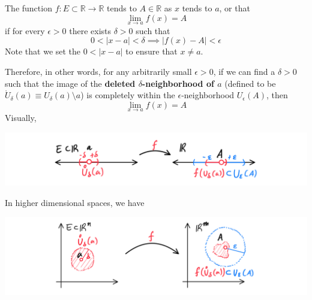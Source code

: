 \documentclass{article}
\begin{document}
    \begin{definition}
      The function $f: E \subset \mathbb{R} \longrightarrow \mathbb{R}$ tends to $A \in \mathbb{R}$ as $x$ tends to $a$, or that 
      \[\lim_{x \rightarrow a} f(x) = A\]
      if for every $\epsilon > 0$ there exists $\delta > 0$ such that 
      \[0<|x - a|<\delta \implies |f(x) - A| < \epsilon\]
      Note that we set the $0<|x-a|$ to ensure that $x \neq a$. 

      Therefore, in other words, for any arbitrarily small $\epsilon > 0$, if we can find a $\delta > 0$ such that the image of the \textbf{deleted $\delta$-neighborhood of $a$} (defined to be $\mathring{U}_\delta (a) \equiv U_\delta (a) \setminus a$) is completely within the $\epsilon$-neighborhood $U_\epsilon (A)$, then 
      \[\lim_{x \rightarrow a} f(x) = A\]
      Visually, 
      \begin{center}
          \includegraphics[scale=0.25]{img/Limit_of_Function_on_R.PNG}
      \end{center}
      In higher dimensional spaces, we have 
      \begin{center}
          \includegraphics[scale=0.25]{img/Limit_of_Function_on_Euclidean_Space.PNG}
      \end{center}
    \end{definition}
\end{document}
